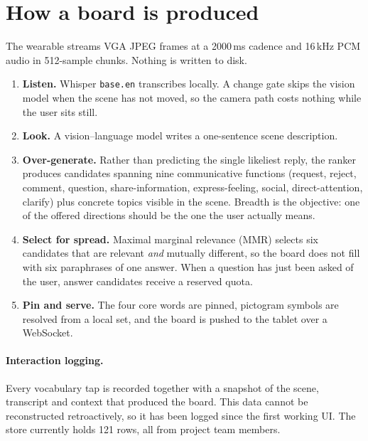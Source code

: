 \documentclass[11pt,a4paper]{article}
\newcommand{\code}[1]{\texttt{\small #1}}
\begin{document}
\section{How a board is produced}

The wearable streams VGA JPEG frames at a 2000\,ms cadence and 16\,kHz PCM audio in
512-sample chunks. Nothing is written to disk.

\begin{enumerate}
  \item \textbf{Listen.} Whisper \code{base.en} transcribes locally. A change gate skips
  the vision model when the scene has not moved, so the camera path costs nothing while
  the user sits still.
  \item \textbf{Look.} A vision--language model writes a one-sentence scene description.
  \item \textbf{Over-generate.} Rather than predicting the single likeliest reply, the
  ranker produces candidates spanning nine communicative functions (request, reject,
  comment, question, share-information, express-feeling, social, direct-attention,
  clarify) plus concrete topics visible in the scene. Breadth is the objective: one of
  the offered directions should be the one the user actually means.
  \item \textbf{Select for spread.} Maximal marginal relevance (MMR) selects six
  candidates that are relevant \emph{and} mutually different, so the board does not fill
  with six paraphrases of one answer. When a question has just been asked of the user,
  answer candidates receive a reserved quota.
  \item \textbf{Pin and serve.} The four core words are pinned, pictogram symbols are
  resolved from a local set, and the board is pushed to the tablet over a WebSocket.
\end{enumerate}

\paragraph{Interaction logging.} Every vocabulary tap is recorded together with a
snapshot of the scene, transcript and context that produced the board. This data cannot
be reconstructed retroactively, so it has been logged since the first working UI. The
store currently holds 121 rows, all from project team members.

\end{document}
